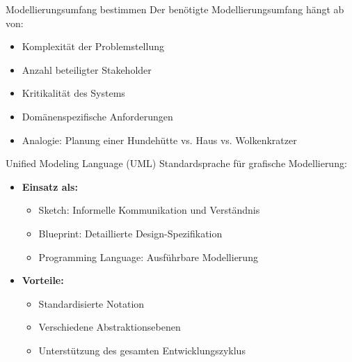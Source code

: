 \begin{KR}{Modellierungsumfang bestimmen}
Der benötigte Modellierungsumfang hängt ab von:
\begin{itemize}
    \item Komplexität der Problemstellung
    \item Anzahl beteiligter Stakeholder
    \item Kritikalität des Systems
    \item Domänenspezifische Anforderungen
    \item Analogie: Planung einer Hundehütte vs. Haus vs. Wolkenkratzer
\end{itemize}
\end{KR}

\begin{definition}{Unified Modeling Language (UML)}
Standardsprache für grafische Modellierung:
\begin{itemize}
    \item \textbf{Einsatz als:}
    \begin{itemize}
        \item Sketch: Informelle Kommunikation und Verständnis
        \item Blueprint: Detaillierte Design-Spezifikation
        \item Programming Language: Ausführbare Modellierung
    \end{itemize}
    \item \textbf{Vorteile:}
    \begin{itemize}
        \item Standardisierte Notation
        \item Verschiedene Abstraktionsebenen
        \item Unterstützung des gesamten Entwicklungszyklus
    \end{itemize}
\end{itemize}
\end{definition}

